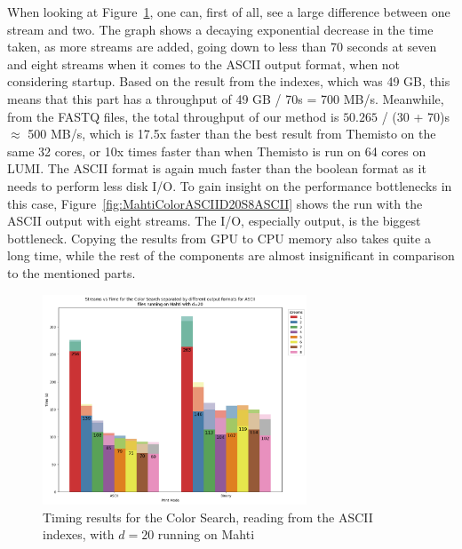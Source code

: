When looking at Figure~\ref{fig:MahtiColorASCIID20}, one can, first of all, see a large difference between one stream and two.
The graph shows a decaying exponential decrease in the time taken, as more streams are added, going down to less than 70 seconds at seven and eight streams when it comes to the ASCII output format, when not considering startup.
Based on the result from the indexes, which was 49 GB, this means that this part has a throughput of 49 GB / 70s = 700 MB/s.
Meanwhile, from the FASTQ files, the total throughput of our method is $50.265$ / (30 + 70)s $\approx$ 500 MB/s, which is 17.5x faster than the best result from Themisto on the same 32 cores, or 10x times faster than when Themisto is run on 64 cores on LUMI.
The ASCII format is again much faster than the boolean format as it needs to perform less disk I/O.
To gain insight on the performance bottlenecks in this case, Figure~\ref{fig:MahtiColorASCIID20S8ASCII} shows the run with the ASCII output with eight streams.
The I/O, especially output, is the biggest bottleneck.
Copying the results from GPU to CPU memory also takes quite a long time, while the rest of the components are almost insignificant in comparison to the mentioned parts.

\begin{figure}[t]
  \centering
  \includegraphics[width=0.7\textwidth]{images/MahtiColorASCIID20.png}
  \caption{Timing results for the Color Search, reading from the ASCII indexes, with $d=20$ running on Mahti}\label{fig:MahtiColorASCIID20}
\end{figure}

